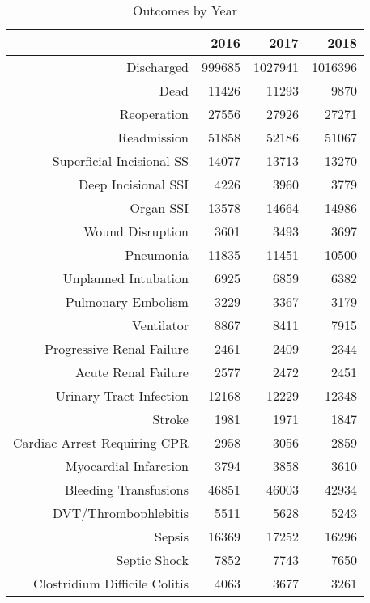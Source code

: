 \begin{table}[ht]
\centering
\begin{tabular}{rrrr}
  \hline
 & 2016 & 2017 & 2018 \\ 
  \hline
Discharged & 999685 & 1027941 & 1016396 \\ 
  Dead & 11426 & 11293 & 9870 \\ 
  Reoperation & 27556 & 27926 & 27271 \\ 
  Readmission & 51858 & 52186 & 51067 \\ 
  Superficial Incisional SS & 14077 & 13713 & 13270 \\ 
  Deep Incisional SSI & 4226 & 3960 & 3779 \\ 
  Organ SSI & 13578 & 14664 & 14986 \\ 
  Wound Disruption & 3601 & 3493 & 3697 \\ 
  Pneumonia & 11835 & 11451 & 10500 \\ 
  Unplanned Intubation & 6925 & 6859 & 6382 \\ 
  Pulmonary Embolism & 3229 & 3367 & 3179 \\ 
  Ventilator & 8867 & 8411 & 7915 \\ 
  Progressive Renal Failure & 2461 & 2409 & 2344 \\ 
  Acute Renal Failure & 2577 & 2472 & 2451 \\ 
  Urinary Tract Infection & 12168 & 12229 & 12348 \\ 
  Stroke & 1981 & 1971 & 1847 \\ 
  Cardiac Arrest Requiring CPR & 2958 & 3056 & 2859 \\ 
  Myocardial Infarction & 3794 & 3858 & 3610 \\ 
  Bleeding Transfusions & 46851 & 46003 & 42934 \\ 
  DVT/Thrombophlebitis & 5511 & 5628 & 5243 \\ 
  Sepsis & 16369 & 17252 & 16296 \\ 
  Septic Shock & 7852 & 7743 & 7650 \\ 
  Clostridium Difficile Colitis & 4063 & 3677 & 3261 \\ 
   \hline
\end{tabular}
\caption{Outcomes by Year} 
\end{table}
